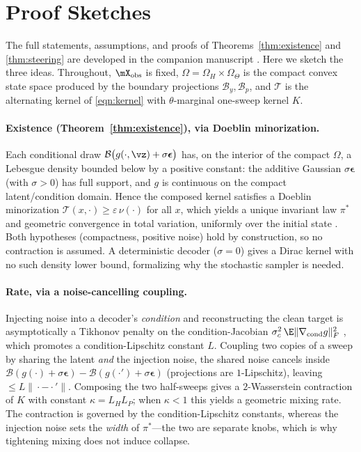 \section{Proof Sketches}
\label{app:proofs}

The full statements, assumptions, and proofs of Theorems~\ref{thm:existence} and \ref{thm:steering}
are developed in the companion manuscript \citep{adcvae-theory}. Here we sketch the three ideas.
Throughout, $\xobs$ is fixed, $\Omega = \Omega_H \times \Omega_\Theta$ is the compact convex state
space produced by the boundary projections $\mathcal{B}_y,\mathcal{B}_p$, and $\mathcal{T}$ is the
alternating kernel of \eqref{eqn:kernel} with $\theta$-marginal one-sweep kernel $K$.

\paragraph{Existence (Theorem~\ref{thm:existence}), via Doeblin minorization.}
Each conditional draw $\mathcal{B}\big(g(\cdot,\vz) + \sigma\boldsymbol{\epsilon}\big)$ has, on the
interior of the compact $\Omega$, a Lebesgue density bounded below by a positive constant: the
additive Gaussian $\sigma\boldsymbol{\epsilon}$ (with $\sigma>0$) has full support, and $g$ is
continuous on the compact latent/condition domain. Hence the composed kernel satisfies a Doeblin
minorization $\mathcal{T}(x,\cdot) \ge \varepsilon\,\nu(\cdot)$ for all $x$, which yields a unique
invariant law $\pi^\ast$ and geometric convergence in total variation, uniformly over the initial
state \citep{meyn2009markov}. Both hypotheses (compactness, positive noise) hold by construction, so
no contraction is assumed. A deterministic decoder ($\sigma=0$) gives a Dirac kernel with no such
density lower bound, formalizing why the stochastic sampler is needed.

\paragraph{Rate, via a noise-cancelling coupling.}
Injecting noise into a decoder's \emph{condition} and reconstructing the clean target is
asymptotically a Tikhonov penalty on the condition-Jacobian $\sigma_c^2\,\E\|\nabla_{\mathrm{cond}}
g\|_F^2$ \citep{bishop1995training}, which promotes a condition-Lipschitz constant $L$. Coupling two
copies of a sweep by sharing the latent \emph{and} the injection noise, the shared noise cancels
inside $\mathcal{B}(g(\cdot)+\sigma\boldsymbol{\epsilon}) - \mathcal{B}(g(\cdot')+\sigma
\boldsymbol{\epsilon})$ (projections are $1$-Lipschitz), leaving $\le L\|\cdot-\cdot'\|$. Composing
the two half-sweeps gives a $2$-Wasserstein contraction of $K$ with constant $\kappa = L_H L_P$; when
$\kappa<1$ this yields a geometric mixing rate. The contraction is governed by the condition-Lipschitz
constants, whereas the injection noise sets the \emph{width} of $\pi^\ast$---the two are separate
knobs, which is why tightening mixing does not induce collapse.

